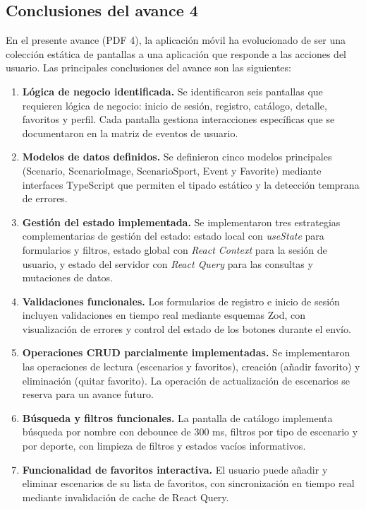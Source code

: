 

\subsection*{Conclusiones del avance 4}

En el presente avance (PDF 4), la aplicaci\'on m\'ovil \nombreApp{} ha
evolucionado de ser una colecci\'on est\'atica de pantallas a una
aplicaci\'on que responde a las acciones del usuario. Las principales
conclusiones del avance son las siguientes:

\begin{enumerate}
  \item \textbf{L\'ogica de negocio identificada.} Se identificaron seis
    pantallas que requieren l\'ogica de negocio: inicio de sesi\'on, registro,
    cat\'alogo, detalle, favoritos y perfil. Cada pantalla gestiona
    interacciones espec\'ificas que se documentaron en la matriz de eventos
    de usuario.

  \item \textbf{Modelos de datos definidos.} Se definieron cinco modelos
    principales (Scenario, ScenarioImage, ScenarioSport, Event y Favorite)
    mediante interfaces TypeScript que permiten el tipado est\'atico y la
    detecci\'on temprana de errores.

  \item \textbf{Gesti\'on del estado implementada.} Se implementaron tres
    estrategias complementarias de gesti\'on del estado: estado local con
    \textit{useState} para formularios y filtros, estado global con
    \textit{React Context} para la sesi\'on de usuario, y estado del servidor
    con \textit{React Query} para las consultas y mutaciones de datos.

  \item \textbf{Validaciones funcionales.} Los formularios de registro e
    inicio de sesi\'on incluyen validaciones en tiempo real mediante esquemas
    Zod, con visualizaci\'on de errores y control del estado de los botones
    durante el env\'io.

  \item \textbf{Operaciones CRUD parcialmente implementadas.} Se implementaron
    las operaciones de lectura (escenarios y favoritos), creaci\'on (a\~nadir
    favorito) y eliminaci\'on (quitar favorito). La operaci\'on de
    actualizaci\'on de escenarios se reserva para un avance futuro.

  \item \textbf{B\'usqueda y filtros funcionales.} La pantalla de cat\'alogo
    implementa b\'usqueda por nombre con debounce de 300 ms, filtros por tipo
    de escenario y por deporte, con limpieza de filtros y estados vac\'ios
    informativos.

  \item \textbf{Funcionalidad de favoritos interactiva.} El usuario puede
    a\~nadir y eliminar escenarios de su lista de favoritos, con
    sincronizaci\'on en tiempo real mediante invalidaci\'on de cache de React Query.
\end{enumerate}

